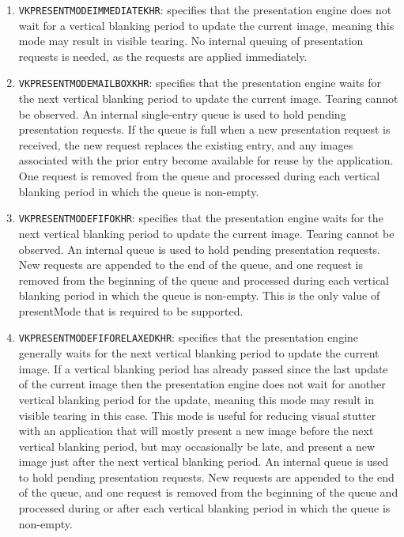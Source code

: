 \documentclass[12pt]{article}
\begin{document}
	\begin{enumerate}
		\item \texttt{VK\textunderscore{}PRESENT\textunderscore{}MODE\textunderscore{}IMMEDIATE\textunderscore{}KHR}: specifies that the presentation engine does not wait for a vertical blanking period to update the current image, meaning this mode may result in visible tearing. No internal queuing of presentation requests is needed, as the requests are applied immediately.
		
		\item \texttt{VK\textunderscore{}PRESENT\textunderscore{}MODE\textunderscore{}MAILBOX\textunderscore{}KHR}: specifies that the presentation engine waits for the next vertical blanking period to update the current image. Tearing cannot be observed. An internal single-entry queue is used to hold pending presentation requests. If the queue is full when a new presentation request is received, the new request replaces the existing entry, and any images associated with the prior entry become available for reuse by the application. One request is removed from the queue and processed during each vertical blanking period in which the queue is non-empty.
		
		\item \texttt{VK\textunderscore{}PRESENT\textunderscore{}MODE\textunderscore{}FIFO\textunderscore{}KHR}: specifies that the presentation engine waits for the next vertical blanking period to update the current image. Tearing cannot be observed. An internal queue is used to hold pending presentation requests. New requests are appended to the end of the queue, and one request is removed from the beginning of the queue and processed during each vertical blanking period in which the queue is non-empty. This is the only value of presentMode that is required to be supported.
		
		\item \texttt{VK\textunderscore{}PRESENT\textunderscore{}MODE\textunderscore{}FIFO\textunderscore{}RELAXED\textunderscore{}KHR}: specifies that the presentation engine generally waits for the next vertical blanking period to update the current image. If a vertical blanking period has already passed since the last update of the current image then the presentation engine does not wait for another vertical blanking period for the update, meaning this mode may result in visible tearing in this case. This mode is useful for reducing visual stutter with an application that will mostly present a new image before the next vertical blanking period, but may occasionally be late, and present a new image just after the next vertical blanking period. An internal queue is used to hold pending presentation requests. New requests are appended to the end of the queue, and one request is removed from the beginning of the queue and processed during or after each vertical blanking period in which the queue is non-empty.
		
	\end{enumerate}
	
\end{document}
